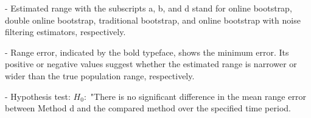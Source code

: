 \documentclass[a4paper,fleqn]{cas-dc}
\begin{document}
\begin{table}[h!]
\begin{threeparttable}
\begin{tablenotes}
          \scriptsize
          \item - Estimated range with the subscripts a, b, and d stand for online bootstrap, double online bootstrap, traditional bootstrap, and online bootstrap with noise filtering estimators, respectively.
          \item - Range error, indicated by the bold typeface, shows the minimum error. Its positive or negative values suggest whether the estimated range is narrower or wider than the true population range, respectively.
         \item - Hypothesis test: $H_0:$ "There is no significant difference in the mean range error between Method d and 
         the compared method over the specified time period.
    \end{tablenotes}
\end{threeparttable}
\end{table}
\end{document}
